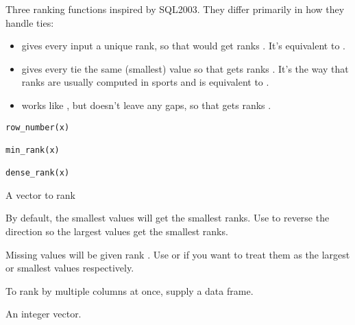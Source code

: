 \documentclass[a4paper]{book}
\begin{document}
%
\begin{Description}
Three ranking functions inspired by SQL2003. They differ primarily in how
they handle ties:
\begin{itemize}

\item{}  gives every input a unique rank, so that 
would get ranks . It's equivalent to
.
\item{}  gives every tie the same (smallest) value so that
 gets ranks . It's the way that ranks
are usually computed in sports and is equivalent to
.
\item{}  works like , but doesn't leave any gaps,
so that  gets ranks .

\end{itemize}

\end{Description}
%
\begin{Usage}
\begin{verbatim}
row_number(x)

min_rank(x)

dense_rank(x)
\end{verbatim}
\end{Usage}
%
\begin{Arguments}
\begin{ldescription}
\item[\code{x}] A vector to rank

By default, the smallest values will get the smallest ranks. Use 
to reverse the direction so the largest values get the smallest ranks.

Missing values will be given rank . Use  or
 if you want to treat them as the largest or smallest
values respectively.

To rank by multiple columns at once, supply a data frame.
\end{ldescription}
\end{Arguments}
%
\begin{Value}
An integer vector.
\end{Value}
\end{document}
